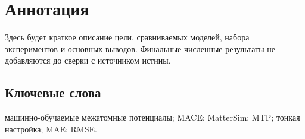 \section*{Аннотация}

Здесь будет краткое описание цели, сравниваемых моделей, набора экспериментов и основных выводов. Финальные численные результаты не добавляются до сверки с источником истины.

\subsection*{Ключевые слова}

машинно-обучаемые межатомные потенциалы; MACE; MatterSim; MTP; тонкая настройка; MAE; RMSE.
